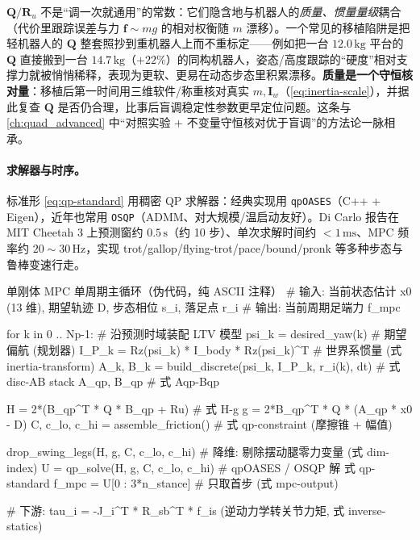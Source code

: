 \begin{pitfall}\label{pit:Q-mass-rescale}
$\mathbf{Q}/\mathbf{R}_u$ 不是“调一次就通用”的常数：它们隐含地与机器人的\emph{质量、惯量量级}耦合（代价里跟踪误差与力 $\mathbf{f}\sim mg$ 的相对权衡随 $m$ 漂移）。一个常见的移植陷阱是把轻机器人的 $\mathbf{Q}$ 整套照抄到重机器人上而不重标定——例如把一台 $12.0\,\mathrm{kg}$ 平台的 $\mathbf{Q}$ 直接搬到一台 $14.7\,\mathrm{kg}$（$+22\%$）的同构机器人，姿态/高度跟踪的“硬度”相对支撑力就被悄悄稀释，表现为更软、更易在动态步态里积累漂移。\textbf{质量是一个守恒核对量}：移植后第一时间用三维软件/称重核对真实 $m,\mathbf{I}_w$（\cref{eq:inertia-scale}），并据此复查 $\mathbf{Q}$ 是否仍合理，比事后盲调稳定性参数更早定位问题。这条与 \cref{ch:quad_advanced} 中“对照实验 $+$ 不变量守恒核对优于盲调”的方法论一脉相承。
\end{pitfall}

\paragraph{ 求解器与时序。}
标准形 \cref{eq:qp-standard} 用稠密 QP 求解器：经典实现用 \texttt{qpOASES}（C++ + Eigen）\cite{dicarlo2018cheetah,yu2021quadruped}，近年也常用 \texttt{OSQP}（ADMM、对大规模/温启动友好）。Di Carlo 报告在 MIT Cheetah 3 上预测窗约 $0.5\,\mathrm{s}$（约 10 步）、单次求解时间约 $<1\,\mathrm{ms}$、MPC 频率约 $20\sim30\,\mathrm{Hz}$，实现 trot/gallop/flying-trot/pace/bound/pronk 等多种步态与鲁棒变速行走\cite{dicarlo2018cheetah}。

\begin{codebox}[text]{单刚体 MPC 单周期主循环（伪代码，纯 ASCII 注释）}
# 输入: 当前状态估计 x0 (13 维), 期望轨迹 D, 步态相位 s_i, 落足点 r_i
# 输出: 当前周期足端力 f_mpc

for k in 0 .. Np-1:                     # 沿预测时域装配 LTV 模型
    psi_k   = desired_yaw(k)            # 期望偏航 (规划器)
    I_P_k   = Rz(psi_k) * I_body * Rz(psi_k)^T   # 世界系惯量 (式 inertia-transform)
    A_k, B_k = build_discrete(psi_k, I_P_k, r_i(k), dt)   # 式 disc-AB
stack A_qp, B_qp                        # 式 Aqp-Bqp

H = 2*(B_qp^T * Q * B_qp + Ru)          # 式 H-g
g = 2*B_qp^T * Q * (A_qp * x0 - D)
C, c_lo, c_hi = assemble_friction()     # 式 qp-constraint (摩擦锥 + 幅值)

drop_swing_legs(H, g, C, c_lo, c_hi)    # 降维: 剔除摆动腿零力变量 (式 dim-index)
U = qp_solve(H, g, C, c_lo, c_hi)       # qpOASES / OSQP 解 式 qp-standard
f_mpc = U[0 : 3*n_stance]               # 只取首步 (式 mpc-output)

# 下游: tau_i = -J_i^T * R_sb^T * f_is  (逆动力学转关节力矩, 式 inverse-statics)
\end{codebox}

